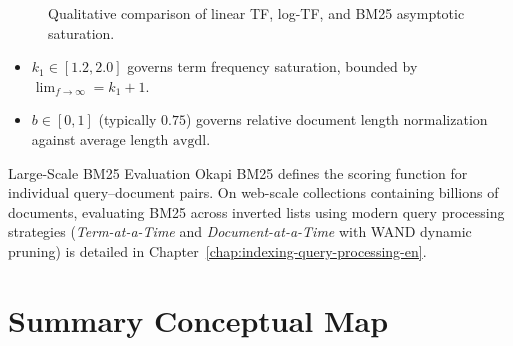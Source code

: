 \begin{figure}[H]
\centering
{}
\caption{Qualitative comparison of linear TF, log-TF, and BM25 asymptotic saturation.}
\label{fig:bm25-saturation-curve}
\end{figure}

\begin{itemize}
    \item $k_1 \in [1.2, 2.0]$ governs term frequency saturation, bounded by $\lim_{f \to \infty} = k_1 + 1$.
    \item $b \in [0, 1]$ (typically $0.75$) governs relative document length normalization against average length $\text{avgdl}$.
\end{itemize}

\begin{noteblock}{Large-Scale BM25 Evaluation}
Okapi BM25 defines the scoring function for individual query--document pairs. On web-scale collections containing billions of documents, evaluating BM25 across inverted lists using modern query processing strategies (\textit{Term-at-a-Time} and \textit{Document-at-a-Time} with WAND dynamic pruning) is detailed in Chapter~\ref{chap:indexing-query-processing-en}.
\end{noteblock}

\FloatBarrier
\section{Summary Conceptual Map}
\label{sec:conceptual-map-en}

